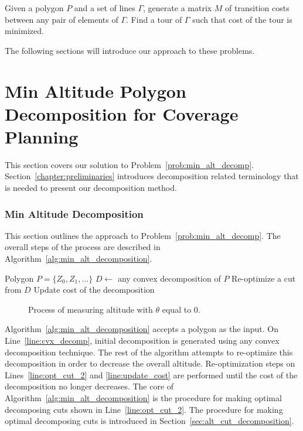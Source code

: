 \documentclass[../main.tex]{subfiles}
\begin{document}
\begin{problem}
\label{problem:min_tour}
Given a polygon $P$ and a set of lines $\Gamma$, generate a matrix $M$ of transition costs between any pair of elements of $\Gamma$. Find a tour of $\Gamma$ such that cost of the tour is minimized.
\end{problem}

The following sections will introduce our approach to these problems.

\section{Min Altitude Polygon Decomposition for Coverage Planning}
\label{section:min_alt_decomposition}

This section covers our solution to Problem~\ref{prob:min_alt_decomp}. Section~\ref{chapter:preliminaries} introduces decomposition related terminology that is needed to present our decomposition method.

\subsubsection{Min Altitude Decomposition}
This section outlines the approach to Problem~\ref{prob:min_alt_decomp}. The overall steps of the process are described in Algorithm~\ref{alg:min_alt_decomposition}.
\begin{algorithm}
	\caption{$\operatorname{min\_alt\_decomposition}(P)$}
	\label{alg:min_alt_decomposition}
	\begin{algorithmic}[1]
		\REQUIRE Polygon $P=\{Z_0,Z_1,\ldots\}$
			\STATE $D\gets$ any convex decomposition of $P$	\label{line:cvx_decomp}
			\REPEAT
				\STATE Re-optimize a cut from $D$ \label{line:opt_cut_2}
				\STATE Update cost of the decomposition \label{line:update_cost}
	\end{algorithmic}
\end{algorithm}

\begin{figure}
	\centering
	
	\caption{Process of measuring altitude with $\theta$ equal to 0.}
	\label{fig:altitude}
\end{figure}


Algorithm~\ref{alg:min_alt_decomposition} accepts a polygon as the input. On Line~\ref{line:cvx_decomp}, initial decomposition is generated using any convex decomposition technique. The rest of the algorithm attempts to re-optimize this decomposition in order to decrease the overall altitude. Re-optimization steps on Lines~\ref{line:opt_cut_2} and \ref{line:update_cost} are performed until the cost of the decomposition no longer decreases. The core of Algorithm~\ref{alg:min_alt_decomposition} is the procedure for making optimal decomposing cuts shown in Line~\ref{line:opt_cut_2}. The procedure for making optimal decomposing cuts is introduced in Section~\ref{sec:alt_cut_decomposition}.
\end{document}
